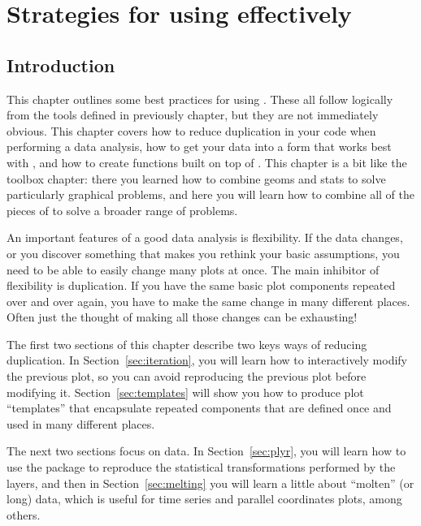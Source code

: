 

% 


\chapter{Strategies for using \ggplot effectively}
\label{cha:strategy}

\section{Introduction}

This chapter outlines some best practices for using \ggplot.  These all follow logically from the tools defined in previously chapter, but they are not immediately obvious.  This chapter covers how to reduce duplication in your code when performing a data analysis, how to get your data into a form that works best with \ggplot, and how to create functions built on top of \ggplot.
This chapter is a bit like the toolbox chapter: there you learned how to combine geoms and stats to solve particularly graphical problems, and here you will learn how to combine all of the pieces of \ggplot to solve a broader range of problems.

An important features of a good data analysis is flexibility. If the data changes, or you discover something that makes you rethink your basic assumptions, you need to be able to easily change many plots at once.  The main inhibitor of flexibility is duplication. If you have the same basic plot components repeated over and over again, you have to make the same change in many different places.  Often just the thought of making all those changes can be exhausting!  

The first two sections of this chapter describe two keys ways of reducing duplication.  In Section~\ref{sec:iteration}, you will learn how to interactively modify the previous plot, so you can avoid reproducing the previous plot before modifying it.  Section~\ref{sec:templates} will show you how to produce plot ``templates'' that encapsulate repeated components that are defined once and used in many different places.

The next two sections focus on data.  In Section~\ref{sec:plyr}, you will learn how to use the  package to reproduce the statistical transformations performed by the layers, and then in Section~\ref{sec:melting} you will learn a little about ``molten'' (or long) data, which is useful for time series and parallel coordinates plots, among others.  

